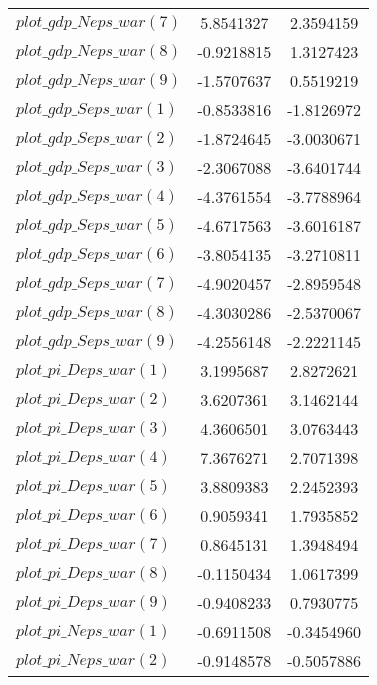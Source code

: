 \begin{center}
\begin{longtable}{lcc}
$plot\_gdp\_N eps\_war (7)  $	 & 	      5.8541327	 & 	      2.3594159 \\ 
$plot\_gdp\_N eps\_war (8)  $	 & 	     -0.9218815	 & 	      1.3127423 \\ 
$plot\_gdp\_N eps\_war (9)  $	 & 	     -1.5707637	 & 	      0.5519219 \\ 
$plot\_gdp\_S eps\_war (1)  $	 & 	     -0.8533816	 & 	     -1.8126972 \\ 
$plot\_gdp\_S eps\_war (2)  $	 & 	     -1.8724645	 & 	     -3.0030671 \\ 
$plot\_gdp\_S eps\_war (3)  $	 & 	     -2.3067088	 & 	     -3.6401744 \\ 
$plot\_gdp\_S eps\_war (4)  $	 & 	     -4.3761554	 & 	     -3.7788964 \\ 
$plot\_gdp\_S eps\_war (5)  $	 & 	     -4.6717563	 & 	     -3.6016187 \\ 
$plot\_gdp\_S eps\_war (6)  $	 & 	     -3.8054135	 & 	     -3.2710811 \\ 
$plot\_gdp\_S eps\_war (7)  $	 & 	     -4.9020457	 & 	     -2.8959548 \\ 
$plot\_gdp\_S eps\_war (8)  $	 & 	     -4.3030286	 & 	     -2.5370067 \\ 
$plot\_gdp\_S eps\_war (9)  $	 & 	     -4.2556148	 & 	     -2.2221145 \\ 
$plot\_pi\_D eps\_war (1)   $	 & 	      3.1995687	 & 	      2.8272621 \\ 
$plot\_pi\_D eps\_war (2)   $	 & 	      3.6207361	 & 	      3.1462144 \\ 
$plot\_pi\_D eps\_war (3)   $	 & 	      4.3606501	 & 	      3.0763443 \\ 
$plot\_pi\_D eps\_war (4)   $	 & 	      7.3676271	 & 	      2.7071398 \\ 
$plot\_pi\_D eps\_war (5)   $	 & 	      3.8809383	 & 	      2.2452393 \\ 
$plot\_pi\_D eps\_war (6)   $	 & 	      0.9059341	 & 	      1.7935852 \\ 
$plot\_pi\_D eps\_war (7)   $	 & 	      0.8645131	 & 	      1.3948494 \\ 
$plot\_pi\_D eps\_war (8)   $	 & 	     -0.1150434	 & 	      1.0617399 \\ 
$plot\_pi\_D eps\_war (9)   $	 & 	     -0.9408233	 & 	      0.7930775 \\ 
$plot\_pi\_N eps\_war (1)   $	 & 	     -0.6911508	 & 	     -0.3454960 \\ 
$plot\_pi\_N eps\_war (2)   $	 & 	     -0.9148578	 & 	     -0.5057886 \\ 

\end{longtable}
\end{center}
